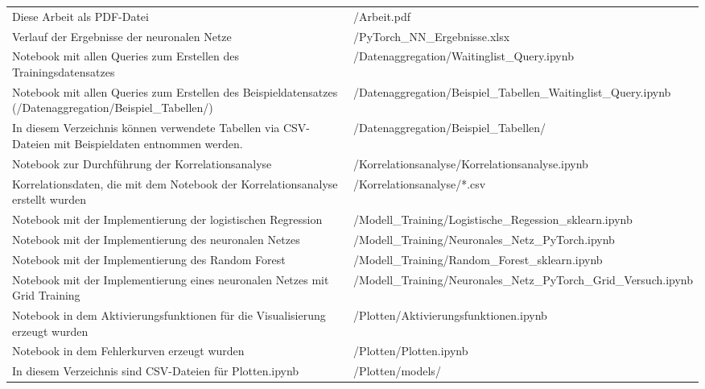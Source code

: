 \begin{longtable}{p{8cm}|>{\raggedright\arraybackslash}p{7cm}}
    \hline\hline
    \endlastfoot
    Diese Arbeit als PDF-Datei & /Arbeit.pdf \\
    Verlauf der Ergebnisse der neuronalen Netze & /PyTorch\_NN\_Ergebnisse.xlsx \\
    \hline
    Notebook mit allen Queries zum Erstellen des Trainingsdatensatzes & /Datenaggregation/\hspace{0pt}Waitinglist\_Query.ipynb \\
    Notebook mit allen Queries zum Erstellen des Beispieldatensatzes (/Datenaggregation/Beispiel\_Tabellen/) & /Datenaggregation/\hspace{0pt}Beispiel\_Tabellen\hspace{0pt}\_Waitinglist\_Query.ipynb \\
    In diesem Verzeichnis können verwendete Tabellen via CSV-Dateien mit Beispieldaten entnommen werden. & /Datenaggregation/\hspace{0pt}Beispiel\_Tabellen/ \\
    \hline
    Notebook zur Durchführung der Korrelationsanalyse & /Korrelationsanalyse/\hspace{0pt}Korrelationsanalyse.ipynb \\
    Korrelationsdaten, die mit dem Notebook der Korrelationsanalyse erstellt wurden & /Korrelationsanalyse/*.csv \\
    \hline
    Notebook mit der Implementierung der logistischen Regression & /Modell\_Training/\hspace{0pt}Logistische\_Regession\_sklearn.ipynb \\
    Notebook mit der Implementierung des neuronalen Netzes & /Modell\_Training/\hspace{0pt}Neuronales\_Netz\_PyTorch.ipynb \\
    Notebook mit der Implementierung des Random Forest & /Modell\_Training/\hspace{0pt}Random\_Forest\_sklearn.ipynb \\
    Notebook mit der Implementierung eines neuronalen Netzes mit Grid Training & /Modell\_Training/Neuronales\_Netz\hspace{0pt}\_PyTorch\_Grid\_Versuch.ipynb \\
    \hline
    Notebook in dem Aktivierungsfunktionen für die Visualisierung erzeugt wurden & /Plotten/\hspace{0pt}Aktivierungsfunktionen.ipynb \\
    Notebook in dem Fehlerkurven erzeugt wurden & /Plotten/\hspace{0pt}Plotten.ipynb \\
    In diesem Verzeichnis sind CSV-Dateien für Plotten.ipynb & /Plotten/models/ \\
\end{longtable}